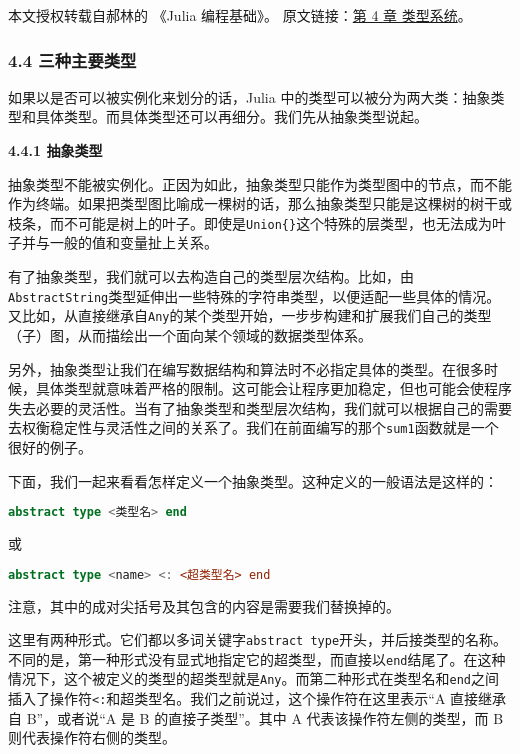 
本文授权转载自郝林的 《Julia 编程基础》。 原文链接：\href{https://github.com/hyper0x/JuliaBasics/blob/master/book/ch04.md}{第 4 章 类型系统}。


\subsubsection{4.4 三种主要类型}

如果以是否可以被实例化来划分的话，Julia 中的类型可以被分为两大类：抽象类型和具体类型。而具体类型还可以再细分。我们先从抽象类型说起。

\textbf{4.4.1 抽象类型}

抽象类型不能被实例化。正因为如此，抽象类型只能作为类型图中的节点，而不能作为终端。如果把类型图比喻成一棵树的话，那么抽象类型只能是这棵树的树干或枝条，而不可能是树上的叶子。即使是\verb|Union{}|这个特殊的层类型，也无法成为叶子并与一般的值和变量扯上关系。

有了抽象类型，我们就可以去构造自己的类型层次结构。比如，由\verb|AbstractString|类型延伸出一些特殊的字符串类型，以便适配一些具体的情况。又比如，从直接继承自\verb|Any|的某个类型开始，一步步构建和扩展我们自己的类型（子）图，从而描绘出一个面向某个领域的数据类型体系。

另外，抽象类型让我们在编写数据结构和算法时不必指定具体的类型。在很多时候，具体类型就意味着严格的限制。这可能会让程序更加稳定，但也可能会使程序失去必要的灵活性。当有了抽象类型和类型层次结构，我们就可以根据自己的需要去权衡稳定性与灵活性之间的关系了。我们在前面编写的那个\verb|sum1|函数就是一个很好的例子。

下面，我们一起来看看怎样定义一个抽象类型。这种定义的一般语法是这样的：

\begin{lstlisting}[language=julia]
abstract type <类型名> end 
\end{lstlisting}

或

\begin{lstlisting}[language=julia]
abstract type <name> <: <超类型名> end
\end{lstlisting}

注意，其中的成对尖括号及其包含的内容是需要我们替换掉的。

这里有两种形式。它们都以多词关键字\verb|abstract type|开头，并后接类型的名称。不同的是，第一种形式没有显式地指定它的超类型，而直接以\verb|end|结尾了。在这种情况下，这个被定义的类型的超类型就是\verb|Any|。而第二种形式在类型名和\verb|end|之间插入了操作符\verb|<:|和超类型名。我们之前说过，这个操作符在这里表示“A 直接继承自 B”，或者说“A 是 B 的直接子类型”。其中 A 代表该操作符左侧的类型，而 B 则代表操作符右侧的类型。

